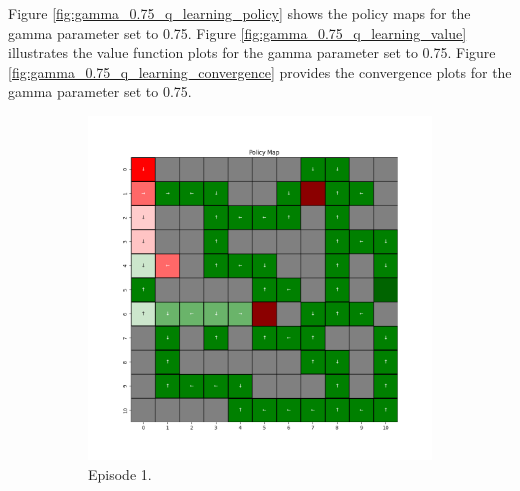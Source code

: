 \documentclass{assignment}
\begin{document}
Figure \ref{fig:gamma_0.75_q_learning_policy} shows the policy maps for the gamma parameter set to 0.75. Figure \ref{fig:gamma_0.75_q_learning_value} illustrates the value function plots for the gamma parameter set to 0.75. Figure \ref{fig:gamma_0.75_q_learning_convergence} provides the convergence plots for the gamma parameter set to 0.75.

\begin{figure}[H]
    \begin{subfigure}{0.3\textwidth}
        \includegraphics[width=\textwidth]{figures/policy_q/gamma_sweep/policy_alpha_0.1_gamma_0.75_epsilon_0.2_iteration_1.png}
    \caption{Episode 1.}
    \end{subfigure}\hfill
    \begin{subfigure}{0.3\textwidth}

\end{subfigure}
\end{figure}
\end{document}
